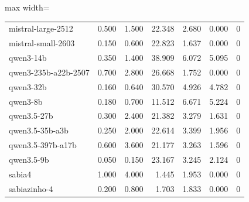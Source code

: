 \begin{table}[htbp]
\begin{adjustbox}{max width=\linewidth}
\begin{tabular}{lrrrrrr}
mistral-large-2512 & 0.500 & 1.500 & 22.348 & 2.680 & 0.000 & 0 \\
mistral-small-2603 & 0.150 & 0.600 & 22.823 & 1.637 & 0.000 & 0 \\
qwen3-14b & 0.350 & 1.400 & 38.909 & 6.072 & 5.095 & 0 \\
qwen3-235b-a22b-2507 & 0.700 & 2.800 & 26.668 & 1.752 & 0.000 & 0 \\
qwen3-32b & 0.160 & 0.640 & 30.570 & 4.926 & 4.782 & 0 \\
qwen3-8b & 0.180 & 0.700 & 11.512 & 6.671 & 5.224 & 0 \\
qwen3.5-27b & 0.300 & 2.400 & 21.382 & 3.279 & 1.631 & 0 \\
qwen3.5-35b-a3b & 0.250 & 2.000 & 22.614 & 3.399 & 1.956 & 0 \\
qwen3.5-397b-a17b & 0.600 & 3.600 & 21.177 & 3.263 & 1.596 & 0 \\
qwen3.5-9b & 0.050 & 0.150 & 23.167 & 3.245 & 2.124 & 0 \\
sabia4 & 1.000 & 4.000 & 1.445 & 1.953 & 0.000 & 0 \\
sabiazinho-4 & 0.200 & 0.800 & 1.703 & 1.833 & 0.000 & 0 \\
\bottomrule
\end{tabular}
\end{adjustbox}
\end{table}

